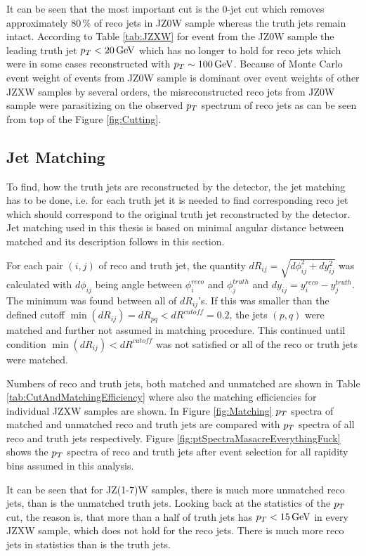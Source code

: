 It can be seen that the most important cut is the 0-jet cut which removes
approximately $80\,\%$ of reco jets in JZ0W sample whereas the truth jets
remain intact. According to Table \ref{tab:JZXW} for event from the JZ0W sample
the leading truth jet $p_{T} < 20 \,\text{GeV}$ which has no longer to hold for reco
jets which were in some cases reconstructed with $p_{T} \sim 100 \,\text{GeV}$. Because of
Monte Carlo event weight of events from JZ0W sample is dominant over event
weights of other JZXW samples by several orders, the misreconstructed reco
jets from JZ0W sample were parasitizing on the observed $p_{T}$ spectrum of reco
jets as can be seen from top of the Figure \ref{fig:Cutting}.

\subsection{Jet Matching}
\label{SubSec:JetMatching}

To find, how the truth jets are reconstructed by the detector, the jet matching
has to be done, i.e. for each truth jet it is needed to find corresponding reco
jet which should correspond to the original truth jet reconstructed by the
detector. Jet matching used in this thesis is based on minimal angular distance
between matched and its description follows in this section.

For each pair $(i,j)$ of reco and truth jet, the quantity $dR_{ij} =
\sqrt{d\phi_{ij}^2 + dy_{ij}^2}$ was calculated with $d\phi_{ij}$ being angle
between $\phi_i^{reco}$ and $\phi_j^{truth}$ and $dy_{ij} = y_i^{reco} -
y_j^{truth}$.  The minimum was found between all of $dR_{ij}$'s. If this was
smaller than the defined cutoff $\min(dR_{ij}) = dR_{pq} < dR^{cutoff} = 0.2$,
the jets $(p,q)$ were matched and further not assumed in matching procedure.
This continued until condition $\min(dR_{ij}) < dR^{cutoff}$ was not satisfied
or all of the reco or truth jets were matched.

Numbers of reco and truth jets, both matched and unmatched are shown in Table
\ref{tab:CutAndMatchingEfficiency} where also the matching efficiencies for
individual JZXW samples are shown. In Figure \ref{fig:Matching} $p_{T}$ spectra of
matched and unmatched reco and truth jets are compared with $p_{T}$ spectra of
all reco and truth jets respectively. Figure
\ref{fig:ptSpectraMasacreEverythingFuck} shows the $p_{T}$ spectra of reco and
truth jets after event selection for all rapidity bins assumed in this analysis.

It can be seen that for JZ(1-7)W samples, there is much more unmatched reco
jets, than is the unmatched truth jets. Looking back at the statistics of the
$p_{T}$ cut, the reason is, that more than a half of truth jets has $p_{T} < 15
\,\text{GeV}$ in every JZXW sample, which does not hold for the reco jets. There is
much more reco jets in statistics than is the truth jets. 

